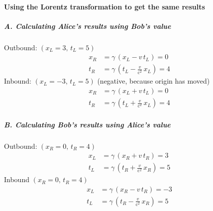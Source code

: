 \documentclass[pagesize,headsepline,10pt,parskip=half]{scrreprt}
\newcommand{\const}[1]{\ensuremath{\mathrm{#1}}}
\renewcommand{\c}{\const{c}}
\begin{document}
        \paragraph{Using the Lorentz transformation to get the same results}
          \subparagraph{A. Calculating Alice’s results using Bob’s value}
            Outbound: $(x_L = 3, \, t_L = 5)$
            \begin{align*}
              x_R &= \gamma \, \left(x_L - v \, t_L\right) = 0\\
              t_R &= \gamma \, \left(t_L - \frac{v}{\c^2} \, x_L\right) = 4
            \end{align*}
            Inbound: $(x_L = -3, \, t_L = 5)$ (negative, because origin has moved)
            \begin{align*}
              x_R &= \gamma \, \left(x_L + v \, t_L\right) = 0\\
              t_R &= \gamma \, \left(t_L + \frac{v}{\c^2} \, x_L\right) = 4
            \end{align*}
          \subparagraph{B. Calculating Bob’s results using Alice’s value}
            Outbound: $(x_R = 0, \, t_R = 4)$
            \begin{align*}
              x_L &= \gamma \, \left(x_R + v \, t_R\right) = 3\\
              t_L &= \gamma \, \left(t_R + \frac{v}{\c^2} \, x_R\right) = 5
            \end{align*}
            Inbound $(x_R = 0, \, t_R = 4)$
            \begin{align*}
              x_L &= \gamma \, \left(x_R - v \, t_R\right) = -3\\
              t_L &= \gamma \, \left(t_R - \frac{v}{\c^2} \, x_R\right) = 5
            \end{align*}
\end{document}
